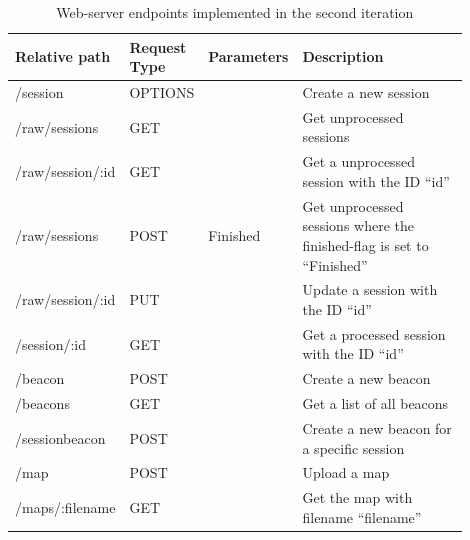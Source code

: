 \documentclass[../Main/thesis.tex]{subfiles}
\begin{document}
\begin{table}[h]
\caption{Web-server endpoints implemented in the second iteration}
\begin{tabular}{|p{0.2\linewidth}|p{0.15\linewidth}|p{0.15\linewidth}|p{0.4\linewidth}|}
\hline
\textbf{Relative path} & \textbf{Request Type} & \textbf{Parameters} & \textbf{Description}                                                    \\ \hline
/session               & OPTIONS               &                     & Create a new session                                                    \\ \hline
/raw/sessions          & GET                   &                     & Get unprocessed sessions                                                \\ \hline
/raw/session/:id       & GET                   &                     & Get a unprocessed session with the ID ``id''                            \\ \hline
/raw/sessions          & POST                  & Finished            & Get unprocessed sessions where the finished-flag is set to ``Finished'' \\ \hline
/raw/session/:id       & PUT                   &                     & Update a session with the ID ``id''                                     \\ \hline
/session/:id           & GET                   &                     & Get a processed session with the ID ``id''                              \\ \hline
/beacon                & POST                  &                     & Create a new beacon                                                     \\ \hline
/beacons               & GET                   &                     & Get a list of all beacons                                               \\ \hline
/sessionbeacon         & POST                  &                     & Create a new beacon for a specific session                              \\ \hline
/map                   & POST                  &                     & Upload a map                                                            \\ \hline
/maps/:filename        & GET                   &                     & Get the map with filename ``filename''                                  \\ \hline
\end{tabular}
\label{tab:endpoints-1}
\end{table}
\end{document}
